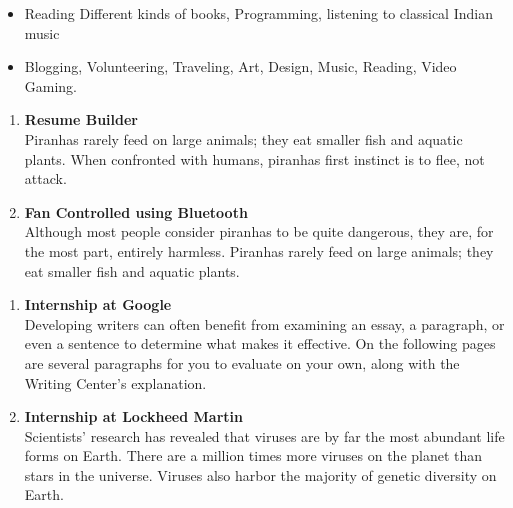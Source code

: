 \documentclass{article}
\newcommand*\ruleline[1]{\par\noindent\raisebox{.8ex}{\makebox[\linewidth]{\hrulefill\hspace{1ex}\raisebox{-.8ex}{#1}\hspace{1ex}\hrulefill}}}
\begin{document}
{\vspace{3pt}
\begin{itemize}[noitemsep,nolistsep]
	\item Reading Different kinds of books, Programming, listening to classical Indian music
	\item Blogging, Volunteering, Traveling, Art, Design, Music, Reading, Video Gaming.
\end{itemize}

\vspace{5pt}
\ruleline{\textcolor{cyan}{\large{\textbf{\uppercase{Projects}}}}}

\vspace{3pt}
\begin{enumerate}
	\item {\textbf{Resume Builder}}\hfill \textit{}\\
	Piranhas rarely feed on large animals; they eat smaller fish and aquatic plants. When confronted with humans, piranhas first instinct is to flee, not attack. 
	\item {\textbf{Fan Controlled using Bluetooth}}\hfill \textit{}\\
	Although most people consider piranhas to be quite dangerous, they are, for the most part, entirely harmless. Piranhas rarely feed on large animals; they eat smaller fish and aquatic plants.
\end{enumerate}
	
\vspace{5pt}
\ruleline{\textcolor{cyan}{\large{\textbf{\uppercase{Internships}}}}}

\vspace{3pt}
\begin{enumerate}
	\item {\textbf{Internship at Google}}\hfill \textit{}\\
	Developing writers can often benefit from examining an essay, a paragraph, or even a sentence to determine what makes it effective. On the following pages are several paragraphs for you to evaluate on your own, along with the Writing Center's explanation.
	\item {\textbf{Internship at Lockheed Martin}}\hfill \textit{}\\
	 Scientists' research has revealed that viruses are by far the most abundant life forms on Earth. There are a million times more viruses on the planet than stars in the universe. Viruses also harbor the majority of genetic diversity on Earth.
\end{enumerate}

}
\end{document}
